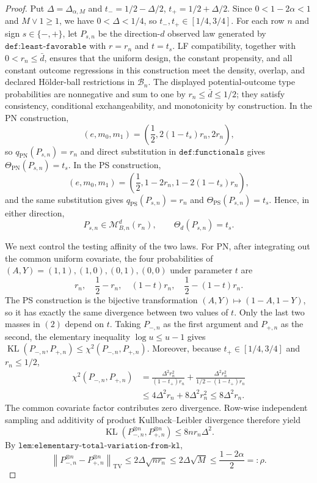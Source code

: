 \documentclass{article}
\begin{document}
\begin{proof}
Put \(\Delta=\Delta_{\alpha,M}\) and \(t_-=1/2-\Delta/2\), \(t_+=1/2+\Delta/2\). Since \(0<1-2\alpha<1\) and \(M\vee1\ge1\), we have \(0<\Delta<1/4\), so \(t_-,t_+\in[1/4,3/4]\). For each row \(n\) and sign \(s\in\{-,+\}\), let \(P_{s,n}\) be the direction-\(d\) observed law generated by \(\texttt{def:least-favorable}\) with \(r=r_n\) and \(t=t_s\). LF compatibility, together with \(0<r_n\le\bar d\), ensures that the uniform design, the constant propensity, and all constant outcome regressions in this construction meet the density, overlap, and declared H\"older-ball restrictions in \(\mathcal B_n\). The displayed potential-outcome type probabilities are nonnegative and sum to one by \(r_n\le\bar d\le1/2\); they satisfy consistency, conditional exchangeability, and monotonicity by construction. In the PN construction,
\[(e,m_0,m_1)=\left(\frac12,2(1-t_s)r_n,2r_n\right),\]
so \(q_{\mathrm{PN}}(P_{s,n})=r_n\) and direct substitution in \(\texttt{def:functionals}\) gives \(\Theta_{\mathrm{PN}}(P_{s,n})=t_s\). In the PS construction,
\[(e,m_0,m_1)=\left(\frac12,1-2r_n,1-2(1-t_s)r_n\right),\]
and the same substitution gives \(q_{\mathrm{PS}}(P_{s,n})=r_n\) and \(\Theta_{\mathrm{PS}}(P_{s,n})=t_s\). Hence, in either direction,
\[P_{s,n}\in\mathcal M_{B,n}^d(r_n),\qquad \Theta_d(P_{s,n})=t_s.\tag{1}\]

We next control the testing affinity of the two laws. For PN, after integrating out the common uniform covariate, the four probabilities of \((A,Y)=(1,1),(1,0),(0,1),(0,0)\) under parameter \(t\) are
\[r_n,\quad \frac12-r_n,\quad (1-t)r_n,\quad \frac12-(1-t)r_n.\tag{2}\]
The PS construction is the bijective transformation \((A,Y)\mapsto(1-A,1-Y)\), so it has exactly the same divergence between two values of \(t\). Only the last two masses in \((2)\) depend on \(t\). Taking \(P_{-,n}\) as the first argument and \(P_{+,n}\) as the second, the elementary inequality \(\log u\le u-1\) gives \(\operatorname{KL}(P_{-,n},P_{+,n})\le\chi^2(P_{-,n},P_{+,n})\). Moreover, because \(t_+\in[1/4,3/4]\) and \(r_n\le1/2\),
\[\begin{aligned}
\chi^2(P_{-,n},P_{+,n})
&=\frac{\Delta^2r_n^2}{(1-t_+)r_n}+\frac{\Delta^2r_n^2}{1/2-(1-t_+)r_n}\\
&\le4\Delta^2r_n+8\Delta^2r_n^2\le8\Delta^2r_n.
\end{aligned}\tag{3}\]
The common covariate factor contributes zero divergence. Row-wise independent sampling and additivity of product Kullback--Leibler divergence therefore yield
\[\operatorname{KL}(P_{-,n}^{\otimes n},P_{+,n}^{\otimes n})\le8n r_n\Delta^2.\tag{4}\]
By \(\texttt{lem:elementary-total-variation-from-kl}\),
\[\left\lVert P_{-,n}^{\otimes n}-P_{+,n}^{\otimes n}\right\rVert_{\mathrm{TV}}\le2\Delta\sqrt{nr_n}\le2\Delta\sqrt M\le\frac{1-2\alpha}{2}=:\rho.\tag{5}\]


\end{proof}
\end{document}
